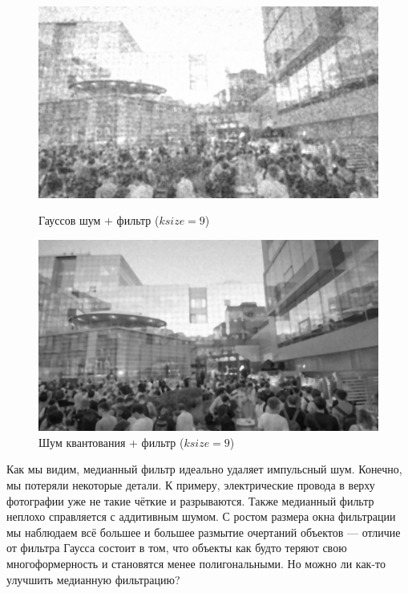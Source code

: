 \documentclass[a4paper]{article}
\begin{document}
\begin{figure}[H]
    \begin{minipage}{0.49\textwidth}
        \centering \includegraphics[width=\textwidth]{images/3_nonlinear_filters/gaussian - median (ksize=9).jpg}
        \caption{Гауссов шум + фильтр ($ksize = 9$)}
    \end{minipage}\hfill
    \begin{minipage}{0.49\textwidth}
        \centering \includegraphics[width=\textwidth]{images/3_nonlinear_filters/poisson - median (ksize=9).jpg}
        \caption{Шум квантования + фильтр ($ksize = 9$)}
    \end{minipage}
\end{figure}
\noindent Как мы видим, медианный фильтр идеально удаляет импульсный шум. Конечно, мы потеряли некоторые детали. К примеру, электрические провода в верху фотографии уже не такие чёткие и разрываются. Также медианный фильтр неплохо справляется с аддитивным шумом. С ростом размера окна фильтрации мы наблюдаем всё большее и большее размытие очертаний объектов --- отличие от фильтра Гаусса состоит в том, что объекты как будто теряют свою многоформерность и становятся менее полигональными. Но можно ли как-то улучшить медианную фильтрацию?\pagebreak
\end{document}
